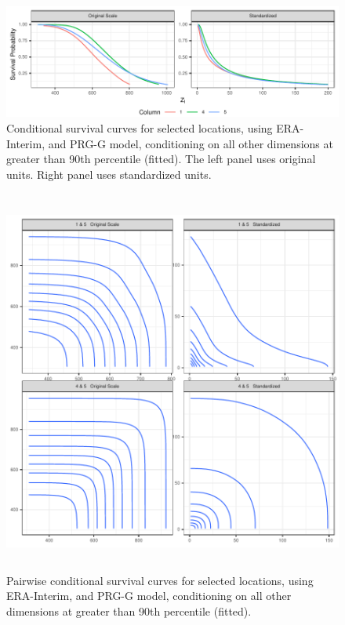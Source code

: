 \begin{figure}[htb]
    \centering
    \caption{Conditional survival curves for selected locations, using ERA-Interim, and PRG-G model,  conditioning on all other dimensions at greater than 90th percentile (fitted)\label{fig:condsurv1d}. The left panel uses original units. Right panel uses standardized units.}
    \includegraphics[width=\linewidth]{./images/condsurv_1d}
\end{figure}

\begin{figure}[htb]
    \centering
    \caption{Pairwise conditional survival curves for selected locations, using ERA-Interim, and PRG-G model, conditioning on all other dimensions at greater than 90th percentile (fitted).\label{fig:condsurv2d}}
    \includegraphics[height=5in, width=5in]{./images/condsurv_2d}
\end{figure}

